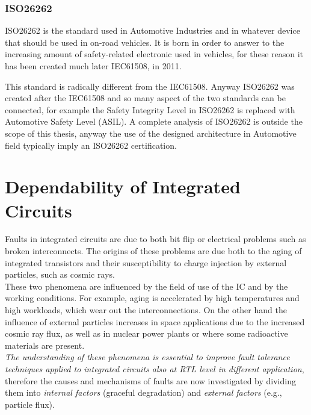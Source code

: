 {{{		    \subsubsection{ISO26262}{
		            ISO26262 is the standard used in Automotive Industries and in whatever device that should be used in on-road vehicles. It is born in order to answer to the increasing amount of safety-related electronic used in vehicles, for these reason it has been created much later IEC61508, in 2011.
		            
		            This standard is radically different from the IEC61508. Anyway ISO26262 was created after the IEC61508 and so many aspect of the two standards can be connected, for example the Safety Integrity Level in ISO26262 is replaced with Automotive Safety Level (ASIL). A complete analysis of ISO26262 is outside the scope of this thesis, anyway the use of the designed architecture in Automotive field typically imply an ISO26262 certification.
		    }
		    
		} %
	}%
	\newpage
	\section{Dependability of Integrated Circuits}{
		Faults in integrated circuits are due to both bit flip or electrical problems such as broken interconnects. The origins of these problems are due both to the aging of integrated transistors and their susceptibility to charge injection by external particles, such as cosmic rays.\\
		
		
		These two phenomena are influenced by the field of use of the IC and by the working conditions. For example, aging is accelerated by high temperatures and high workloads, which wear out the interconnections. On the other hand the influence of external particles increases in space applications due to the increased cosmic ray flux, as well as in nuclear power plants or where some radioactive materials are present.\\
		
		
		\textit{The understanding of these phenomena is essential to improve fault tolerance techniques applied to integrated circuits also at RTL level in different application}, therefore the causes and mechanisms of faults are now investigated by dividing them into \textit{internal factors} (graceful degradation) and \textit{external factors} (e.g., particle flux).
		
}}
